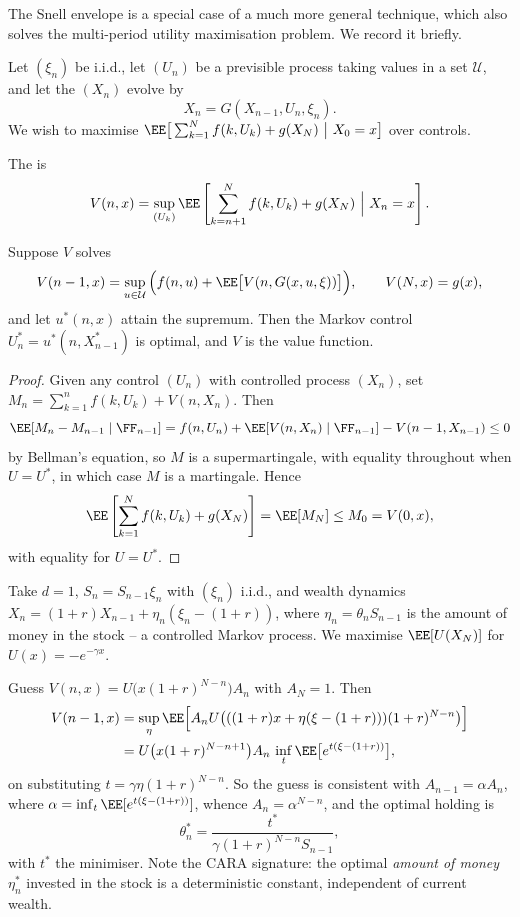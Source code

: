 The Snell envelope is a special case of a much more general technique, which also solves the multi-period utility maximisation problem. We record it briefly.

Let $(\xi_n)$ be i.i.d., let $(U_n)$ be a previsible  process taking values in a set $\mathcal{U}$, and let the  $(X_n)$ evolve by
$$
X_n = G(X_{n-1}, U_n, \xi_n).
$$
We wish to maximise $\EE\big[\sum_{k=1}^N f(k,U_k) + g(X_N)\ \big|\ X_0 = x\big]$ over controls.

\begin{definition}
	The  is
	$$
	V(n,x) = \sup_{(U_k)}\EE\left[\sum_{k=n+1}^N f(k,U_k) + g(X_N)\ \Big|\ X_n = x\right].
	$$
\end{definition}

\begin{theorem}[Bellman]\label{thm:bellman}
	Suppose $V$ solves 
	$$
	V(n-1,x) = \sup_{u\in\mathcal{U}}\Big(f(n,u) + \EE\big[V(n, G(x,u,\xi))\big]\Big), \qquad V(N,x) = g(x),
	$$
	and let $u^*(n,x)$ attain the supremum. Then the Markov control $U_n^* = u^*(n,X^*_{n-1})$ is optimal, and $V$ is the value function.
\end{theorem}

\begin{proof}
	Given any control $(U_n)$ with controlled process $(X_n)$, set $M_n = \sum_{k=1}^n f(k,U_k) + V(n,X_n)$. Then
	$$
	\EE[M_n - M_{n-1}\mid\FF_{n-1}] = f(n,U_n) + \EE[V(n,X_n)\mid\FF_{n-1}] - V(n-1,X_{n-1}) \leq 0
	$$
	by Bellman's equation, so $M$ is a supermartingale, with equality throughout when $U = U^*$, in which case $M$ is a martingale. Hence
	$$
	\EE\left[\sum_{k=1}^N f(k,U_k) + g(X_N)\right] = \EE[M_N] \leq M_0 = V(0,x),
	$$
	with equality for $U = U^*$.
\end{proof}

\begin{example}
	Take $d=1$, $S_n = S_{n-1}\xi_n$ with $(\xi_n)$ i.i.d., and wealth dynamics $X_n = (1+r)X_{n-1} + \eta_n(\xi_n - (1+r))$, where $\eta_n = \theta_nS_{n-1}$ is the amount of money in the stock -- a controlled Markov process. We maximise $\EE[U(X_N)]$ for $U(x) = -e^{-\gamma x}$.

	Guess $V(n,x) = U\big(x(1+r)^{N-n}\big)A_n$ with $A_N = 1$. Then
	\begin{align*}
		V(n-1,x) &= \sup_\eta \EE\Big[A_nU\big(((1+r)x + \eta(\xi - (1+r)))(1+r)^{N-n}\big)\Big]\\
		&= U\big(x(1+r)^{N-n+1}\big)A_n\,\inf_{t}\EE\big[e^{t(\xi - (1+r))}\big],
	\end{align*}
	on substituting $t = \gamma\eta(1+r)^{N-n}$. So the guess is consistent with $A_{n-1} = \alpha A_n$, where $\alpha = \inf_t\EE[e^{t(\xi-(1+r))}]$, whence $A_n = \alpha^{N-n}$, and the optimal holding is
	$$
	\theta_n^* = \frac{t^*}{\gamma(1+r)^{N-n}S_{n-1}},
	$$
	with $t^*$ the minimiser. Note the CARA signature: the optimal \emph{amount of money} $\eta^*_n$ invested in the stock is a deterministic constant, independent of current wealth.
\end{example}

